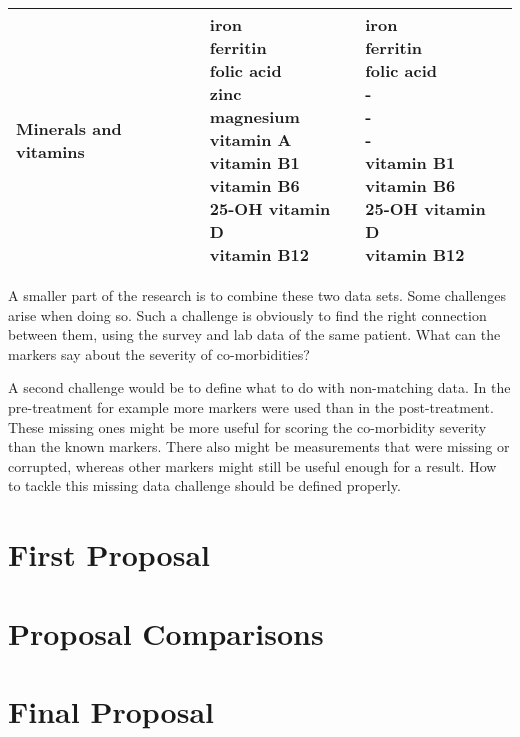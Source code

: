 \documentclass[10pt,a4paper]{article}
\begin{document}
\begin{table}
\begin{tabular}{lll}
			Minerals and vitamins & \makecell{iron\\ferritin\\folic acid\\zinc\\magnesium\\vitamin A\\vitamin B1\\vitamin B6\\25-OH vitamin D\\vitamin B12}                                        & \makecell{iron\\ferritin\\folic acid\\-\\-\\-\\vitamin B1\\vitamin B6\\25-OH vitamin D\\vitamin B12}                                                           \\ \hline
		\end{tabular}
	\end{table}
	
	A smaller part of the research is to combine these two data sets. Some challenges arise when doing so. Such a challenge is obviously to find the right connection between them, using the survey and lab data of the same patient. What can the markers say about the severity of co-morbidities?
	
	A second challenge would be to define what to do with non-matching data. In the pre-treatment for example more markers were used than in the post-treatment. These missing ones might be more useful for scoring the co-morbidity severity than the known markers. There also might be measurements that were missing or corrupted, whereas other markers might still be useful enough for a result. How to tackle this missing data challenge should be defined properly.
	
	\section{First Proposal}
	
	\section{Proposal Comparisons}
	
	\section{Final Proposal}
	
	 
	
	
\end{document}
